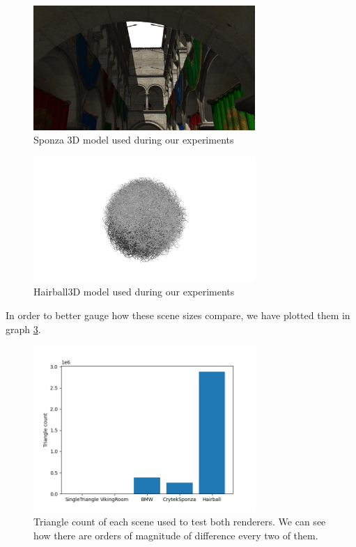 \begin{figure}[hbt!]
  \centering
  \includegraphics[width=0.75\textwidth]{figuras/sponza.png}
  \caption{Sponza 3D model used during our experiments}
  \label{sponza-screenshot}
\end{figure}
\begin{figure}[hbt!]
  \centering
  \includegraphics[width=0.75\textwidth]{figuras/hairball.png}
  \caption{Hairball3D model used during our experiments}
  \label{hairball-screenshot}
\end{figure}
In order to better gauge how these scene sizes compare, we have plotted them in graph \ref{scenes-geometry-graph}.

\begin{figure}[hbt!]
  \centering
  \includegraphics[width=0.75\textwidth]{figuras/scenes-geometry.png}
  \caption{Triangle count of each scene used to test both renderers. We can see how there are orders of magnitude of difference every two of them.}
  \label{scenes-geometry-graph}
\end{figure}

